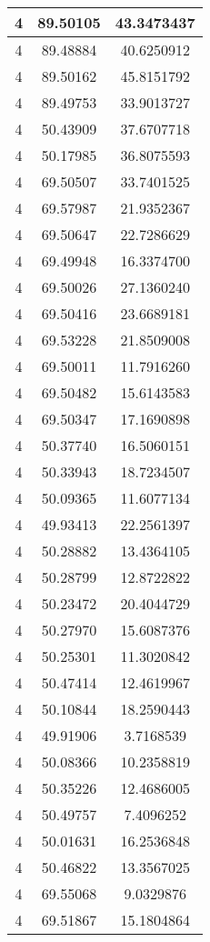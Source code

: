 \documentclass[
]{book}
\begin{document}
\begin{tabular}{c|c|c}
\hline
4 & 89.50105 & 43.3473437\\
\hline
4 & 89.48884 & 40.6250912\\
\hline
4 & 89.50162 & 45.8151792\\
\hline
4 & 89.49753 & 33.9013727\\
\hline
4 & 50.43909 & 37.6707718\\
\hline
4 & 50.17985 & 36.8075593\\
\hline
4 & 69.50507 & 33.7401525\\
\hline
4 & 69.57987 & 21.9352367\\
\hline
4 & 69.50647 & 22.7286629\\
\hline
4 & 69.49948 & 16.3374700\\
\hline
4 & 69.50026 & 27.1360240\\
\hline
4 & 69.50416 & 23.6689181\\
\hline
4 & 69.53228 & 21.8509008\\
\hline
4 & 69.50011 & 11.7916260\\
\hline
4 & 69.50482 & 15.6143583\\
\hline
4 & 69.50347 & 17.1690898\\
\hline
4 & 50.37740 & 16.5060151\\
\hline
4 & 50.33943 & 18.7234507\\
\hline
4 & 50.09365 & 11.6077134\\
\hline
4 & 49.93413 & 22.2561397\\
\hline
4 & 50.28882 & 13.4364105\\
\hline
4 & 50.28799 & 12.8722822\\
\hline
4 & 50.23472 & 20.4044729\\
\hline
4 & 50.27970 & 15.6087376\\
\hline
4 & 50.25301 & 11.3020842\\
\hline
4 & 50.47414 & 12.4619967\\
\hline
4 & 50.10844 & 18.2590443\\
\hline
4 & 49.91906 & 3.7168539\\
\hline
4 & 50.08366 & 10.2358819\\
\hline
4 & 50.35226 & 12.4686005\\
\hline
4 & 50.49757 & 7.4096252\\
\hline
4 & 50.01631 & 16.2536848\\
\hline
4 & 50.46822 & 13.3567025\\
\hline
4 & 69.55068 & 9.0329876\\
\hline
4 & 69.51867 & 15.1804864\\

\end{tabular}
\end{document}
